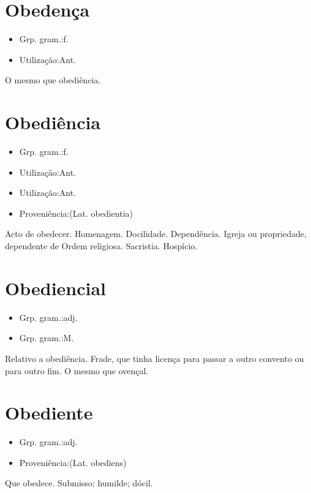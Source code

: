\section{Obedença}
\begin{itemize}
\item {Grp. gram.:f.}
\end{itemize}
\begin{itemize}
\item {Utilização:Ant.}
\end{itemize}
O mesmo que \textunderscore obediência\textunderscore .
\section{Obediência}
\begin{itemize}
\item {Grp. gram.:f.}
\end{itemize}
\begin{itemize}
\item {Utilização:Ant.}
\end{itemize}
\begin{itemize}
\item {Utilização:Ant.}
\end{itemize}
\begin{itemize}
\item {Proveniência:(Lat. \textunderscore obedientia\textunderscore )}
\end{itemize}
Acto de obedecer.
Homenagem.
Docilidade.
Dependência.
Igreja ou propriedade, dependente de Ordem religiosa.
Sacristia.
Hospício.
\section{Obediencial}
\begin{itemize}
\item {Grp. gram.:adj.}
\end{itemize}
\begin{itemize}
\item {Grp. gram.:M.}
\end{itemize}
Relativo a obediência.
Frade, que tinha licença para passar a outro convento ou para outro fim.
O mesmo que \textunderscore ovençal\textunderscore .
\section{Obediente}
\begin{itemize}
\item {Grp. gram.:adj.}
\end{itemize}
\begin{itemize}
\item {Proveniência:(Lat. \textunderscore obediens\textunderscore )}
\end{itemize}
Que obedece.
Submisso; humilde; dócil.
